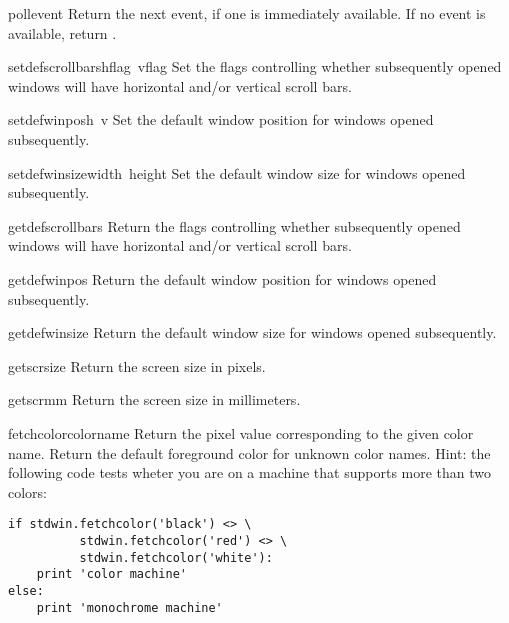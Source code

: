\begin{funcdesc}{pollevent}{}
Return the next event, if one is immediately available.
If no event is available, return \code{()}.
\end{funcdesc}

\begin{funcdesc}{setdefscrollbars}{hflag\, vflag}
Set the flags controlling whether subsequently opened windows will
have horizontal and/or vertical scroll bars.
\end{funcdesc}

\begin{funcdesc}{setdefwinpos}{h\, v}
Set the default window position for windows opened subsequently.
\end{funcdesc}

\begin{funcdesc}{setdefwinsize}{width\, height}
Set the default window size for windows opened subsequently.
\end{funcdesc}

\begin{funcdesc}{getdefscrollbars}{}
Return the flags controlling whether subsequently opened windows will
have horizontal and/or vertical scroll bars.
\end{funcdesc}

\begin{funcdesc}{getdefwinpos}{}
Return the default window position for windows opened subsequently.
\end{funcdesc}

\begin{funcdesc}{getdefwinsize}{}
Return the default window size for windows opened subsequently.
\end{funcdesc}

\begin{funcdesc}{getscrsize}{}
Return the screen size in pixels.
\end{funcdesc}

\begin{funcdesc}{getscrmm}{}
Return the screen size in millimeters.
\end{funcdesc}

\begin{funcdesc}{fetchcolor}{colorname}
Return the pixel value corresponding to the given color name.
Return the default foreground color for unknown color names.
Hint: the following code tests wheter you are on a machine that
supports more than two colors:
\bcode\begin{verbatim}
if stdwin.fetchcolor('black') <> \
          stdwin.fetchcolor('red') <> \
          stdwin.fetchcolor('white'):
    print 'color machine'
else:
    print 'monochrome machine'
\end{verbatim}\ecode
\end{funcdesc}

